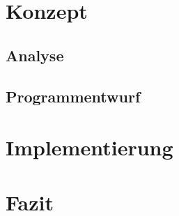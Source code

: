 \documentclass[11pt,ngerman]{report}
\begin{document}
\chapter{Konzept}

\section{Analyse}



\section{Programmentwurf}



\chapter{Implementierung}



\chapter{Fazit}
\end{document}
